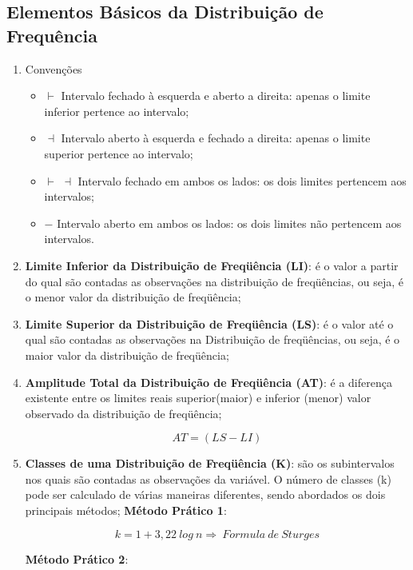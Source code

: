 \newpage
\subsection{Elementos Básicos da Distribuição de Frequência}

\begin{enumerate}
\item Convenções
\begin{itemize}
\item $\vdash$ Intervalo fechado à esquerda e aberto a direita: apenas o limite inferior pertence ao intervalo;
\item $\dashv$ Intervalo aberto à esquerda e fechado a direita: apenas o limite superior pertence ao intervalo;
\item $\vdash$ $\dashv$ Intervalo fechado em ambos os lados: os dois limites pertencem aos intervalos;
\item $-$ Intervalo aberto em ambos os lados: os dois limites não pertencem aos intervalos.
\end{itemize}
\item \textbf{Limite Inferior da Distribuição de Freqüência (LI)}: é o valor a partir do qual são contadas as observações na distribuição de freqüências, ou seja, é o menor valor da distribuição de freqüência;
\item \textbf{Limite Superior da Distribuição de Freqüência (LS)}: é o valor até o qual são contadas as observações na Distribuição de freqüências, ou seja, é o maior valor da distribuição de freqüência;
\item \textbf{Amplitude Total da Distribuição de Freqüência (AT)}: é a diferença existente entre os limites reais superior(maior) e inferior (menor) valor observado da distribuição de freqüência;

$$ AT= (LS-LI) $$

\item \textbf{Classes de uma Distribuição de Freqüência (K)}: são os subintervalos nos quais são contadas as observações da variável. O número de classes (k) pode ser calculado de várias maneiras diferentes, sendo abordados os dois principais métodos;\vskip0.3cm
\textbf{Método Prático 1}:

$$ k= 1+3,22 \ log \ n \Rightarrow \ Formula \ de \ Sturges $$

\textbf{Método Prático 2}: \vskip0.3cm


\end{enumerate}
